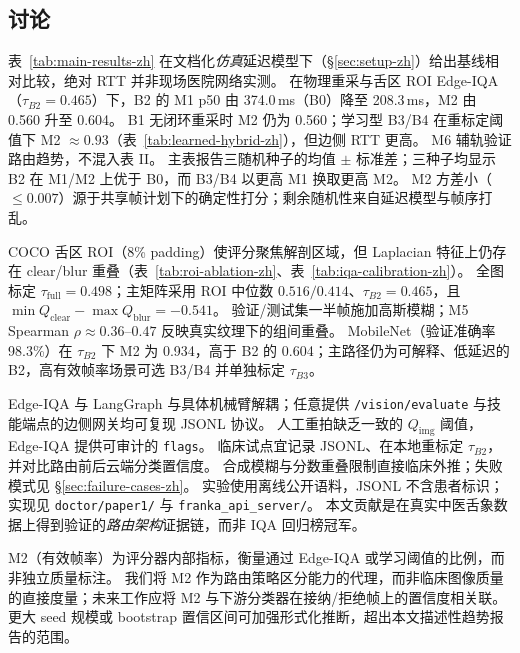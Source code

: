 \subsection{讨论}
\label{sec:discussion-zh}

表~\ref{tab:main-results-zh} 在文档化\emph{仿真}延迟模型下（\S\ref{sec:setup-zh}）给出基线相对比较，绝对 RTT 并非现场医院网络实测。
在物理重采与舌区 ROI Edge-IQA（$\tau_{B2}{=}0.465$）下，B2 的 M1 p50 由 374.0\,ms（B0）降至 208.3\,ms，M2 由 0.560 升至 0.604。
B1 无闭环重采时 M2 仍为 0.560；学习型 B3/B4 在重标定阈值下 M2 $\approx 0.93$（表~\ref{tab:learned-hybrid-zh}），但边侧 RTT 更高。
M6 辅轨验证路由趋势，不混入表 II。
主表报告三随机种子的均值 $\pm$ 标准差；三种子均显示 B2 在 M1/M2 上优于 B0，而 B3/B4 以更高 M1 换取更高 M2。
M2 方差小（$\leq 0.007$）源于共享帧计划下的确定性打分；剩余随机性来自延迟模型与帧序打乱。

COCO 舌区 ROI（8\% padding）使评分聚焦解剖区域，但 Laplacian 特征上仍存在 clear/blur 重叠（表~\ref{tab:roi-ablation-zh}、表~\ref{tab:iqa-calibration-zh}）。
全图标定 $\tau_{\mathrm{full}}{=}0.498$；主矩阵采用 ROI 中位数 $0.516/0.414$、$\tau_{B2}{=}0.465$，且 $\min Q_{\mathrm{clear}}-\max Q_{\mathrm{blur}}{=}{-}0.541$。
验证/测试集一半帧施加高斯模糊；M5 Spearman $\rho{\approx}0.36$--$0.47$ 反映真实纹理下的组间重叠。
MobileNet（验证准确率 98.3\%）在 $\tau_{B2}$ 下 M2 为 0.934，高于 B2 的 0.604；主路径仍为可解释、低延迟的 B2，高有效帧率场景可选 B3/B4 并单独标定 $\tau_{B3}$。

Edge-IQA 与 LangGraph 与具体机械臂解耦；任意提供 \texttt{/vision/evaluate} 与技能端点的边侧网关均可复现 JSONL 协议。
人工重拍缺乏一致的 $Q_{\mathrm{img}}$ 阈值，Edge-IQA 提供可审计的 \texttt{flags}。
临床试点宜记录 JSONL、在本地重标定 $\tau_{B2}$，并对比路由前后云端分类置信度。
合成模糊与分数重叠限制直接临床外推；失败模式见 \S\ref{sec:failure-cases-zh}。
实验使用离线公开语料，JSONL 不含患者标识；实现见 \texttt{doctor/paper1/} 与 \texttt{franka\_api\_server/}。
本文贡献是在真实中医舌象数据上得到验证的\emph{路由架构}证据链，而非 IQA 回归榜冠军。

M2（有效帧率）为评分器内部指标，衡量通过 Edge-IQA 或学习阈值的比例，而非独立质量标注。
我们将 M2 作为路由策略区分能力的代理，而非临床图像质量的直接度量；未来工作应将 M2 与下游分类器在接纳/拒绝帧上的置信度相关联。
更大 seed 规模或 bootstrap 置信区间可加强形式化推断，超出本文描述性趋势报告的范围。
